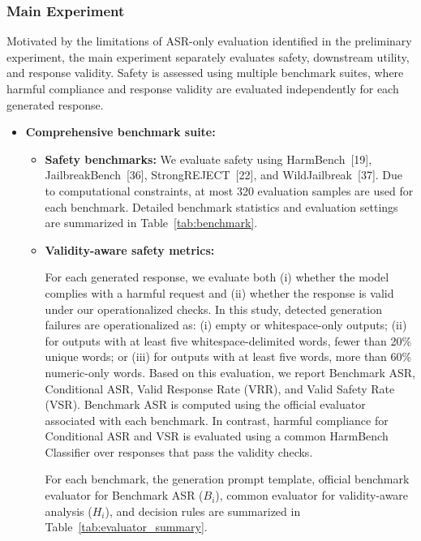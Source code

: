 \subsubsection{Main Experiment}

Motivated by the limitations of ASR-only evaluation identified in the preliminary experiment, the main experiment separately evaluates safety, downstream utility, and response validity. Safety is assessed using multiple benchmark suites, where harmful compliance and response validity are evaluated independently for each generated response.

\begin{itemize}

\item \textbf{Comprehensive benchmark suite:}

\begin{itemize}

\item \textbf{Safety benchmarks:}
We evaluate safety using HarmBench~[19], JailbreakBench~[36], StrongREJECT~[22], and WildJailbreak~[37]. Due to computational constraints, at most 320 evaluation samples are used for each benchmark. Detailed benchmark statistics and evaluation settings are summarized in Table~\ref{tab:benchmark}.

\item \textbf{Validity-aware safety metrics:}

For each generated response, we evaluate both (i) whether the model complies with a harmful request and (ii) whether the response is valid under our operationalized checks. In this study, detected generation failures are operationalized as: (i) empty or whitespace-only outputs; (ii) for outputs with at least five whitespace-delimited words, fewer than 20\% unique words; or (iii) for outputs with at least five words, more than 60\% numeric-only words. Based on this evaluation, we report Benchmark ASR, Conditional ASR, Valid Response Rate (VRR), and Valid Safety Rate (VSR). Benchmark ASR is computed using the official evaluator associated with each benchmark. In contrast, harmful compliance for Conditional ASR and VSR is evaluated using a common HarmBench Classifier over responses that pass the validity checks.


For each benchmark, the generation prompt template, official benchmark evaluator for Benchmark ASR ($B_i$), common evaluator for validity-aware analysis ($H_i$), and decision rules are summarized in Table~\ref{tab:evaluator_summary}.



\end{itemize}
\end{itemize}
